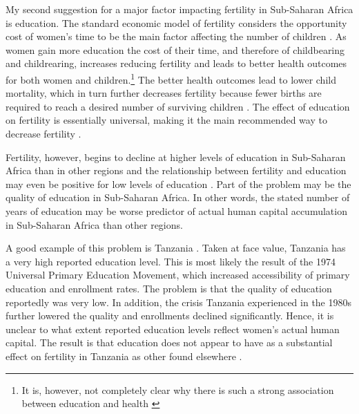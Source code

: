 \documentclass[]{article}
\begin{document}
My second suggestion for a major factor impacting fertility in Sub-Saharan Africa is education. The standard economic model of fertility considers the opportunity cost of women's time to be the main factor affecting the number of children \citep{becker91}. As women gain more education the cost of their time, and therefore of childbearing and childrearing, increases reducing fertility and leads to better health outcomes for both women and children.\footnote{It is, however, not completely clear why there is such a strong association between education and health \citep{Thomas1991,Glewwe1999,Kovsted2002}} The better health outcomes lead to lower child mortality, which in turn further decreases fertility because fewer births are required to reach a desired number of surviving children \citep{Ainsworth1996}. The effect of education on fertility is essentially universal, making it the main recommended way to decrease fertility \citep{schultz02}.

Fertility, however, begins to decline at higher levels of education in Sub-Saharan Africa than in other regions and the relationship between fertility and education may even be positive for low levels of education \citep{Ainsworth1996,Benefo1996,Thomas1996}. Part of the problem may be the quality of education in Sub-Saharan Africa. In other words, the stated number of years of education may be worse predictor of actual human capital accumulation in Sub-Saharan Africa than other regions.

A good example of this problem is Tanzania \citep{Galabawa2001,Wedgwood2005}. Taken at face value, Tanzania has a very high reported education level. This is most likely the result of the 1974 Universal Primary Education Movement, which increased accessibility of primary education and enrollment rates. The problem is that the quality of education reportedly was very low. In addition, the crisis Tanzania experienced in the 1980s further lowered the quality and enrollments declined significantly. Hence, it is unclear to what extent reported education levels reflect women's actual human capital. The result is that education does not appear to have as a substantial effect on fertility in Tanzania as other found elsewhere \citet{Alam2016}.
\end{document}
